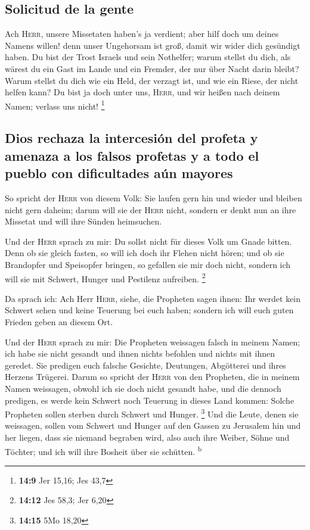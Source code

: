 \hypertarget{solicitud-de-la-gente}{%
\subsection{Solicitud de la gente}\label{solicitud-de-la-gente}}

 Ach \textsc{Herr}, unsere Missetaten haben's ja verdient;
aber hilf doch um deines Namens willen! denn unser Ungehorsam ist groß,
damit wir wider dich gesündigt haben.  Du bist der Trost
Israels und sein Nothelfer; warum stellst du dich, als wärest du ein
Gast im Lande und ein Fremder, der nur über Nacht darin bleibt?
 Warum stellst du dich wie ein Held, der verzagt ist, und
wie ein Riese, der nicht helfen kann? Du bist ja doch unter uns,
\textsc{Herr}, und wir heißen nach deinem Namen; verlass uns nicht!
\footnote{\textbf{14:9} Jer 15,16; Jes 43,7}

\hypertarget{dios-rechaza-la-intercesiuxf3n-del-profeta-y-amenaza-a-los-falsos-profetas-y-a-todo-el-pueblo-con-dificultades-auxfan-mayores}{%
\subsection{Dios rechaza la intercesión del profeta y amenaza a los
falsos profetas y a todo el pueblo con dificultades aún
mayores}\label{dios-rechaza-la-intercesiuxf3n-del-profeta-y-amenaza-a-los-falsos-profetas-y-a-todo-el-pueblo-con-dificultades-auxfan-mayores}}

 So spricht der \textsc{Herr} von diesem Volk: Sie laufen
gern hin und wieder und bleiben nicht gern daheim; darum will sie der
\textsc{Herr} nicht, sondern er denkt nun an ihre Missetat und will ihre
Sünden heimsuchen.

 Und der \textsc{Herr} sprach zu mir: Du sollst nicht für
dieses Volk um Gnade bitten.  Denn ob sie gleich fasten,
so will ich doch ihr Flehen nicht hören; und ob sie Brandopfer und
Speisopfer bringen, so gefallen sie mir doch nicht, sondern ich will sie
mit Schwert, Hunger und Pestilenz aufreiben. \footnote{\textbf{14:12}
  Jes 58,3; Jer 6,20}

 Da sprach ich: Ach Herr \textsc{Herr}, siehe, die
Propheten sagen ihnen: Ihr werdet kein Schwert sehen und keine Teuerung
bei euch haben; sondern ich will euch guten Frieden geben an diesem Ort.

 Und der \textsc{Herr} sprach zu mir: Die Propheten
weissagen falsch in meinem Namen; ich habe sie nicht gesandt und ihnen
nichts befohlen und nichts mit ihnen geredet. Sie predigen euch falsche
Gesichte, Deutungen, Abgötterei und ihres Herzens Trügerei.
 Darum so spricht der \textsc{Herr} von den Propheten,
die in meinem Namen weissagen, obwohl ich sie doch nicht gesandt habe,
und die dennoch predigen, es werde kein Schwert noch Teuerung in dieses
Land kommen: Solche Propheten sollen sterben durch Schwert und Hunger.
\footnote{\textbf{14:15} 5Mo 18,20}  Und die Leute, denen
sie weissagen, sollen vom Schwert und Hunger auf den Gassen zu Jerusalem
hin und her liegen, dass sie niemand begraben wird, also auch ihre
Weiber, Söhne und Töchter; und ich will ihre Bosheit über sie schütten.
\textsuperscript{b}

